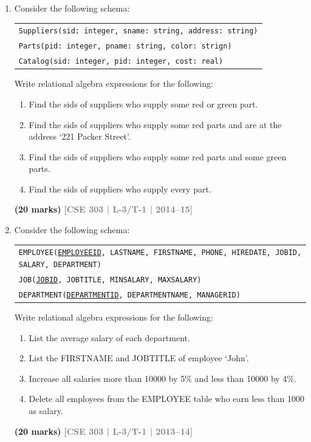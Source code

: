 \documentclass[12pt,a3paper]{article}
\newcommand{\yr}[1]{\hfill\textcolor{gray}{\small\textbf{[#1]}}}
\newcommand{\mk}[1]{\textcolor{orange!70!black}{\small\textbf{(#1 marks)}}}
\begin{document}
\begin{enumerate}
\begin{center}
\begin{tabular}{cl}
\end{tabular}
\end{center}

\mk{15} \yr{CSE 303 | L-3/T-1 | 2015--16}

\item Consider the following schema:
\begin{center}
\begin{tabular}{l}
\texttt{Suppliers(sid: integer, sname: string, address: string)}\\
\texttt{Parts(pid: integer, pname: string, color: strign)}\\
\texttt{Catalog(sid: integer, pid: integer, cost: real)}
\end{tabular}
\end{center}
Write relational algebra expressions for the following:
\begin{enumerate}
  \item Find the sids of suppliers who supply some red or green part.
  \item Find the sids of suppliers who supply some red parts and are at the address `221 Packer Street'.
  \item Find the sids of suppliers who supply some red parts and some green parts.
  \item Find the sids of suppliers who supply every part.
\end{enumerate}
\mk{20} \yr{CSE 303 | L-3/T-1 | 2014--15}

\item Consider the following schema:
\begin{center}
\begin{tabular}{l}
\texttt{EMPLOYEE(\underline{EMPLOYEEID}, LASTNAME, FIRSTNAME, PHONE, HIREDATE, JOBID, SALARY, DEPARTMENT)}\\
\texttt{JOB(\underline{JOBID}, JOBTITLE, MINSALARY, MAXSALARY)}\\
\texttt{DEPARTMENT(\underline{DEPARTMENTID}, DEPARTMENTNAME, MANAGERID)}
\end{tabular}
\end{center}
Write relational algebra expressions for the following:
\begin{enumerate}
  \item List the average salary of each department.
  \item List the FIRSTNAME and JOBTITLE of employee `John'.
  \item Increase all salaries more than 10000 by 5\% and less than 10000 by 4\%.
  \item Delete all employees from the EMPLOYEE table who earn less than 1000 as salary.
\end{enumerate}
\mk{20} \yr{CSE 303 | L-3/T-1 | 2013--14}


\end{enumerate}
\end{document}
